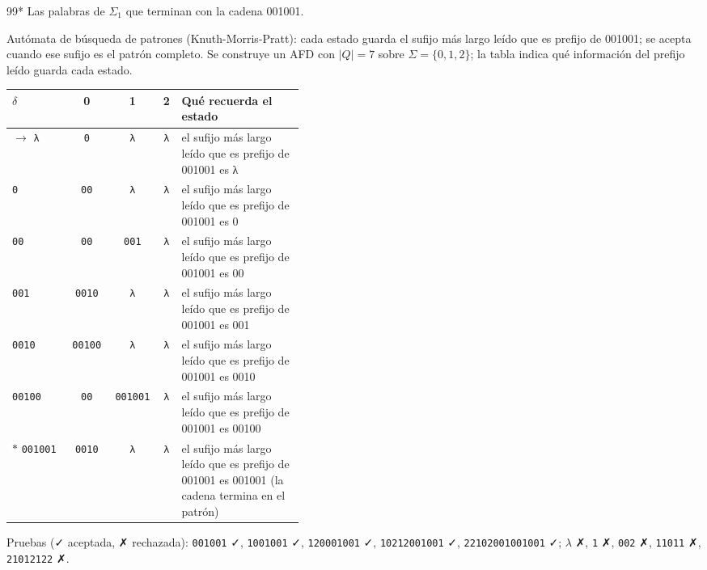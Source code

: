 \documentclass[11pt]{article}
\begin{document}
\begin{ejercicio}{99}{*}
Las palabras de $\Sigma_1$ que terminan con la cadena 001001.
\end{ejercicio}
\proc Autómata de búsqueda de patrones (Knuth-Morris-Pratt): cada estado guarda el sufijo más largo leído que es prefijo de 001001; se acepta cuando ese sufijo es el patrón completo. Se construye un AFD con $|Q| = 7$ sobre $\Sigma = \{0, 1, 2\}$; la tabla indica qué información del prefijo leído guarda cada estado.
\begin{center}\small\begin{tabular}{lcccp{0.42\linewidth}}\toprule
$\delta$ & 0 & 1 & 2 & Qué recuerda el estado \\\midrule
$\to$ \texttt{λ} & \texttt{0} & \texttt{λ} & \texttt{λ} & el sufijo más largo leído que es prefijo de 001001 es λ \\
 \texttt{0} & \texttt{00} & \texttt{λ} & \texttt{λ} & el sufijo más largo leído que es prefijo de 001001 es 0 \\
 \texttt{00} & \texttt{00} & \texttt{001} & \texttt{λ} & el sufijo más largo leído que es prefijo de 001001 es 00 \\
 \texttt{001} & \texttt{0010} & \texttt{λ} & \texttt{λ} & el sufijo más largo leído que es prefijo de 001001 es 001 \\
 \texttt{0010} & \texttt{00100} & \texttt{λ} & \texttt{λ} & el sufijo más largo leído que es prefijo de 001001 es 0010 \\
 \texttt{00100} & \texttt{00} & \texttt{001001} & \texttt{λ} & el sufijo más largo leído que es prefijo de 001001 es 00100 \\
$*$ \texttt{001001} & \texttt{0010} & \texttt{λ} & \texttt{λ} & el sufijo más largo leído que es prefijo de 001001 es 001001 (la cadena termina en el patrón) \\
\bottomrule\end{tabular}\end{center}
Pruebas (✓ aceptada, ✗ rechazada): \texttt{001001} ✓, \texttt{1001001} ✓, \texttt{120001001} ✓, \texttt{10212001001} ✓, \texttt{22102001001001} ✓; $\lambda$ ✗, \texttt{1} ✗, \texttt{002} ✗, \texttt{11011} ✗, \texttt{21012122} ✗.
\end{document}
